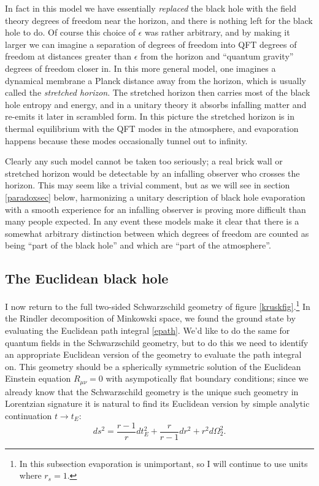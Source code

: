 \documentclass[12pt]{article}
\newcommand{\be}{\begin{equation}}
\newcommand{\ee}{\end{equation}}
\begin{document}
In fact in this model we have essentially \textit{replaced} the black hole with the field theory degrees of freedom near the horizon, and there is nothing left for the black hole to do.  Of course this choice of $\epsilon$ was rather arbitrary, and by making it larger we can imagine a separation of degrees of freedom into QFT degrees of freedom at distances greater than $\epsilon$ from the horizon and ``quantum gravity'' degrees of freedom closer in.  In this more general model, one imagines a dynamical membrane a Planck distance away from the horizon, which is usually called the \textit{stretched horizon}.  The stretched horizon then carries most of the black hole entropy and energy, and in a unitary theory it absorbs infalling matter and re-emits it later in scrambled form.  In this picture the stretched horizon is in thermal equilibrium with the QFT modes in the atmosphere, and evaporation happens because these modes occasionally tunnel out to infinity.    

Clearly any such model cannot be taken too seriously; a real brick wall or stretched horizon would be detectable by an infalling observer who crosses the horizon.  This may seem like a trivial comment, but as we will see in section \ref{paradoxsec} below, harmonizing a unitary description of black hole evaporation with a smooth experience for an infalling observer is proving more difficult than many people expected.  In any event these models make it clear that there is a somewhat arbitrary distinction between which degrees of freedom are counted as being ``part of the black hole'' and which are ``part of the atmosphere''.



\subsection{The Euclidean black hole}\label{eucblacksec}
I now return to the full two-sided Schwarzschild geometry of figure \ref{kruskfig}.\footnote{In this subsection evaporation is unimportant, so I will continue to use units where $r_s=1$.}  In the Rindler decomposition of Minkowski space, we found the ground state by evaluating the Euclidean path integral \eqref{epath}.  We'd like to do the same for quantum fields in the Schwarzschild geometry, but to do this we need to identify an appropriate Euclidean version of the geometry to evaluate the path integral on.  This geometry should be a spherically symmetric solution of the Euclidean Einstein equation $R_{\mu\nu}=0$ with asympotically flat boundary conditions; since we already know that the Schwarzschild geometry is the unique such geometry in Lorentzian signature it is natural to find its Euclidean version by simple analytic continuation $t\to t_E$:
\be
ds^2=\frac{r-1}{r}dt_E^2+\frac{r}{r-1}dr^2+r^2 d\Omega_2^2.
\ee  
\end{document}
